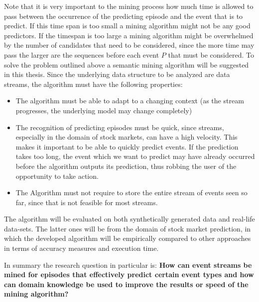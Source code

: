 Note that it is very important to the mining process how much time is allowed to pass between the occurrence of the predicting episode and the event that is to predict. If this time span is too small a mining algorithm might not be any good predictors. If the timespan is too large a mining algorithm might be overwhelmed by the number of candidates that need to be considered, since the more time may pass the larger are the sequences before each event $P$ that must be considered. %
\newline
To solve the problem outlined above a semantic mining algorithm will be suggested in this thesis. Since the underlying data structure to be analyzed are data streams, the algorithm must have the following properties:
\begin{itemize}
	\item The algorithm must be able to adapt to a changing context (as the stream progresses, the underlying model may change completely)
	\item The recognition of predicting episodes must be quick, since streams, especially in the domain of stock markets, can have a high velocity. This makes it important to be able to quickly predict events. If the prediction takes too long, the event which we want to predict may have already occurred before the algorithm outputs its prediction, thus robbing the user of the opportunity to take action.
	\item The Algorithm must not require to store the entire stream of events seen so far, since that is not feasible for most streams.
\end{itemize}

The algorithm will be evaluated on both synthetically generated data and real-life data-sets. The latter ones will be from the domain of stock market prediction, in which the developed algorithm will be empirically compared to other approaches in terms of accuracy measures and execution time.

In summary the research question in particular is:\newline \newline
\textbf{How can event streams be mined for episodes that effectively predict certain event types and how can domain knowledge be used to improve the results or speed of the mining algorithm?}